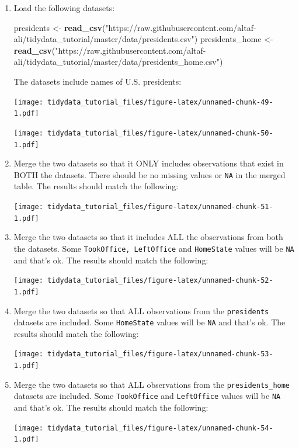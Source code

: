 \documentclass[]{article}
\newenvironment{Shaded}{\begin{snugshade}}{\end{snugshade}}
\newcommand{\KeywordTok}[1]{\textcolor[rgb]{0.13,0.29,0.53}{\textbf{{#1}}}}
\newcommand{\StringTok}[1]{\textcolor[rgb]{0.31,0.60,0.02}{{#1}}}
\newcommand{\NormalTok}[1]{{#1}}
\theoremstyle{definition}
\theoremstyle{definition}
\theoremstyle{definition}
\theoremstyle{remark}
\begin{document}
\begin{enumerate}
\def\labelenumi{\arabic{enumi}.}
\item
  Load the following datasets:

\begin{Shaded}
\begin{Highlighting}[]
\NormalTok{presidents <-}\StringTok{ }\KeywordTok{read_csv}\NormalTok{(}\StringTok{"https://raw.githubusercontent.com/altaf-ali/tidydata_tutorial/master/data/presidents.csv"}\NormalTok{)}
\NormalTok{presidents_home <-}\StringTok{ }\KeywordTok{read_csv}\NormalTok{(}\StringTok{"https://raw.githubusercontent.com/altaf-ali/tidydata_tutorial/master/data/presidents_home.csv"}\NormalTok{)}
\end{Highlighting}
\end{Shaded}

  The datasets include names of U.S. presidents:

  \texttt{[image: tidydata\_tutorial\_files/figure-latex/unnamed-chunk-49-1.pdf]}

  \texttt{[image: tidydata\_tutorial\_files/figure-latex/unnamed-chunk-50-1.pdf]}
\item
  Merge the two datasets so that it ONLY includes observations that
  exist in BOTH the datasets. There should be no missing values or
  \texttt{NA} in the merged table. The results should match the
  following:

  \texttt{[image: tidydata\_tutorial\_files/figure-latex/unnamed-chunk-51-1.pdf]}
\item
  Merge the two datasets so that it includes ALL the observations from
  both the datasets. Some \texttt{TookOffice,\ LeftOffice} and
  \texttt{HomeState} values will be \texttt{NA} and that's ok. The
  results should match the following:

  \texttt{[image: tidydata\_tutorial\_files/figure-latex/unnamed-chunk-52-1.pdf]}
\item
  Merge the two datasets so that ALL observations from the
  \texttt{presidents} datasets are included. Some \texttt{HomeState}
  values will be \texttt{NA} and that's ok. The results should match the
  following:

  \texttt{[image: tidydata\_tutorial\_files/figure-latex/unnamed-chunk-53-1.pdf]}
\item
  Merge the two datasets so that ALL observations from the
  \texttt{presidents\_home} datasets are included. Some
  \texttt{TookOffice} and \texttt{LeftOffice} values will be \texttt{NA}
  and that's ok. The results should match the following:

  \texttt{[image: tidydata\_tutorial\_files/figure-latex/unnamed-chunk-54-1.pdf]}
\end{enumerate}
\end{document}
